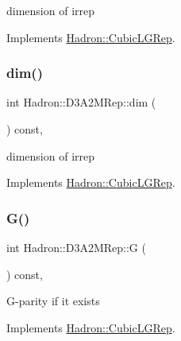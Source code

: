 dimension of irrep 

Implements \mbox{\hyperlink{structHadron_1_1CubicLGRep_a3acbaea26503ed64f20df693a48e4cdd}{Hadron\+::\+Cubic\+L\+G\+Rep}}.

\mbox{\label{structHadron_1_1D3A2MRep_ae911a1abb0e401263bce94ba89ac6142}} 
\subsubsection{\texorpdfstring{dim()}{dim()}\hspace{0.1cm}{\footnotesize\ttfamily [2/2]}}
{\footnotesize\ttfamily int Hadron\+::\+D3\+A2\+M\+Rep\+::dim (\begin{DoxyParamCaption}{ }\end{DoxyParamCaption}) const\hspace{0.3cm}{\ttfamily [inline]}, {\ttfamily [virtual]}}

dimension of irrep 

Implements \mbox{\hyperlink{structHadron_1_1CubicLGRep_a3acbaea26503ed64f20df693a48e4cdd}{Hadron\+::\+Cubic\+L\+G\+Rep}}.

\mbox{\label{structHadron_1_1D3A2MRep_aba5bc123585e4308b60da9a6a0077fea}} 
\subsubsection{\texorpdfstring{G()}{G()}\hspace{0.1cm}{\footnotesize\ttfamily [1/2]}}
{\footnotesize\ttfamily int Hadron\+::\+D3\+A2\+M\+Rep\+::G (\begin{DoxyParamCaption}{ }\end{DoxyParamCaption}) const\hspace{0.3cm}{\ttfamily [inline]}, {\ttfamily [virtual]}}

G-\/parity if it exists 

Implements \mbox{\hyperlink{structHadron_1_1CubicLGRep_ace26f7b2d55e3a668a14cb9026da5231}{Hadron\+::\+Cubic\+L\+G\+Rep}}.

\mbox{\label{structHadron_1_1D3A2MRep_aba5bc123585e4308b60da9a6a0077fea}} 
